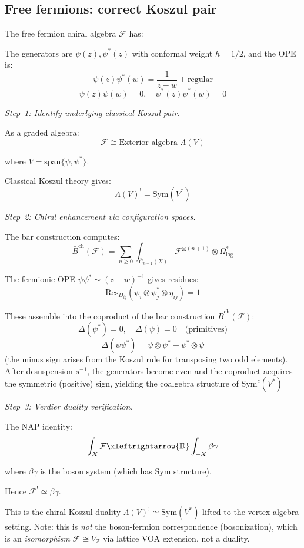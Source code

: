 \subsection{Free fermions: correct Koszul pair}

\begin{example}\label{ex:fermions-NAP}
The free fermion chiral algebra $\mathcal{F}$ has:

The generators are $\psi(z), \psi^*(z)$ with conformal weight $h = 1/2$, and the OPE is:
\[\psi(z) \psi^*(w) = \frac{1}{z-w} + \text{regular}\]
\[\psi(z) \psi(w) = 0, \quad \psi^*(z) \psi^*(w) = 0\]

\emph{Step~1: Identify underlying classical Koszul pair.}

As a graded algebra:
\[\mathcal{F} \cong \text{Exterior algebra } \Lambda(V)\]

where $V = \text{span}\{\psi, \psi^*\}$.

Classical Koszul theory gives:
\[\Lambda(V)^! = \text{Sym}(V^*)\]

\emph{Step~2: Chiral enhancement via configuration spaces.}

The bar construction computes:
\[\bar{B}^{\text{ch}}(\mathcal{F}) = \sum_{n \geq 0} \int_{\overline{C}_{n+1}(X)} \mathcal{F}^{\boxtimes(n+1)} \otimes \Omega^*_{\log}\]

The fermionic OPE $\psi \psi^* \sim (z-w)^{-1}$ gives residues:
\[\text{Res}_{D_{ij}}(\psi_i \otimes \psi^*_j \otimes \eta_{ij}) = 1\]

These assemble into the coproduct of the bar construction $\bar{B}^{\mathrm{ch}}(\mathcal{F})$:
\[\Delta(\psi^*) = 0, \quad \Delta(\psi) = 0 \quad \text{(primitives)}\]
\[\Delta(\psi \psi^*) = \psi \otimes \psi^* - \psi^* \otimes \psi\]
(the minus sign arises from the Koszul rule for transposing two odd elements).  After desuspension $s^{-1}$, the generators become even and the coproduct acquires the symmetric (positive) sign, yielding the coalgebra structure of $\mathrm{Sym}^c(V^*)$

\emph{Step~3: Verdier duality verification.}

The NAP identity:
\[\int_X \mathcal{F} \xleftrightarrow{\mathbb{D}} \int_{-X} \beta\gamma\]

where $\beta\gamma$ is the boson system (which has $\text{Sym}$ structure).

Hence $\mathcal{F}^! \simeq \beta\gamma$.

This is the chiral Koszul duality $\Lambda(V)^! \simeq \mathrm{Sym}(V^*)$ lifted to the vertex algebra setting. Note: this is \emph{not} the boson-fermion correspondence (bosonization), which is an \emph{isomorphism} $\mathcal{F} \cong V_{\mathbb{Z}}$ via lattice VOA extension, not a duality.
\end{example}

